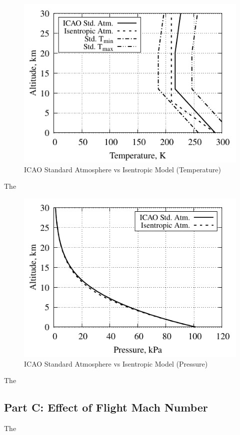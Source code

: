\documentclass[conf]{new-aiaa} %
\begin{document}
\begin{figure}[hbt!]
\centering
\includegraphics[]{media/atmosphere_validation_files/ICAO_vs_ISEN_temperature.pdf}
\caption{\label{fig:partbtemp} ICAO Standard Atmosphere vs Isentropic Model (Temperature)}
\end{figure}
The

\begin{figure}[hbt!]
\centering
\includegraphics[]{media/atmosphere_validation_files/ICAO_vs_ISEN_pressure.pdf}
\caption{\label{fig:partbpres}ICAO Standard Atmosphere vs Isentropic Model (Pressure)}
\end{figure}
The

\subsection{Part C: Effect of Flight Mach Number}
The
\end{document}

